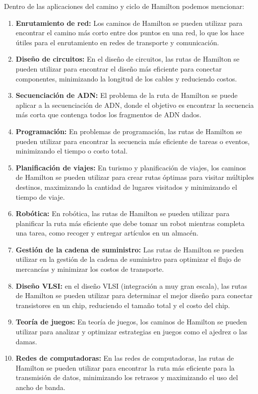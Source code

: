 Dentro de las aplicaciones del camino y ciclo de Hamilton podemos mencionar:
\begin{enumerate}

\item \textbf{Enrutamiento de red:} Los caminos de Hamilton se pueden utilizar para encontrar el camino más corto entre dos puntos en una red, lo que los hace útiles para el enrutamiento en redes de transporte y comunicación.

\item \textbf{Diseño de circuitos:} En el diseño de circuitos, las rutas de Hamilton se pueden utilizar para encontrar el diseño más eficiente para conectar componentes, minimizando la longitud de los cables y reduciendo costos.

\item \textbf{Secuenciación de ADN:} El problema de la ruta de Hamilton se puede aplicar a la secuenciación de ADN, donde el objetivo es encontrar la secuencia más corta que contenga todos los fragmentos de ADN dados.

\item \textbf{Programación:} En problemas de programación, las rutas de Hamilton se pueden utilizar para encontrar la secuencia más eficiente de tareas o eventos, minimizando el tiempo o costo total.

\item \textbf{Planificación de viajes:} En turismo y planificación de viajes, los caminos de Hamilton se pueden utilizar para crear rutas óptimas para visitar múltiples destinos, maximizando la cantidad de lugares visitados y minimizando el tiempo de viaje.

\item \textbf{Robótica:} En robótica, las rutas de Hamilton se pueden utilizar para planificar la ruta más eficiente que debe tomar un robot mientras completa una tarea, como recoger y entregar artículos en un almacén.

\item \textbf{Gestión de la cadena de suministro:} Las rutas de Hamilton se pueden utilizar en la gestión de la cadena de suministro para optimizar el flujo de mercancías y minimizar los costos de transporte.

\item \textbf{Diseño VLSI:} en el diseño VLSI (integración a muy gran escala), las rutas de Hamilton se pueden utilizar para determinar el mejor diseño para conectar transistores en un chip, reduciendo el tamaño total y el costo del chip.

\item \textbf{Teoría de juegos:} En teoría de juegos, los caminos de Hamilton se pueden utilizar para analizar y optimizar estrategias en juegos como el ajedrez o las damas.

\item \textbf{Redes de computadoras:} En las redes de computadoras, las rutas de Hamilton se pueden utilizar para encontrar la ruta más eficiente para la transmisión de datos, minimizando los retrasos y maximizando el uso del ancho de banda.

\end{enumerate}
